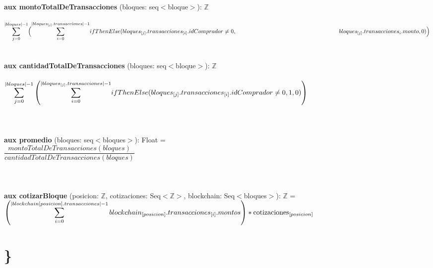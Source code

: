 \documentclass{article}
\newcommand{\Entero}{$\mathds{Z}$}
\begin{document}
        {\selectfont\textbf{aux montoTotalDeTransacciones} (bloques: seq$<$bloque$>$): \Entero}\\\\
    \indent\indent $\mathlarger\sum\limits_{j=0}^{|bloques|-1} \Bigl(\mathlarger\sum\limits_{i=0}^{|bloques_{[j]}.transacciones|-1}
        ifThenElse (bloques_{[j]}.transacciones_{[i]}.idComprador \ne 0,\\
        \indent\indent\indent\indent\indent\indent\indent\indent\indent\indent\indent\indent bloques_{[j]}.transacciones_{{i}}.monto, 0)\Bigr)$\\\\\\

        {\selectfont\textbf{aux cantidadTotalDeTransacciones} (bloques: seq$<$bloque$>$): \Entero}\\\\
    \indent\indent$\mathlarger\sum\limits_{j=0}^{|bloques|-1} \left(\mathlarger\sum\limits_{i=0}^{|bloques_{[j]}.transacciones|-1} ifThenElse(bloques_{[j]}.transacciones_{[i]}.idComprador \ne 0, 1, 0)\right)\indent\indent\indent$\\\\\\\\

    {\selectfont\textbf{aux promedio} (bloques: seq$<$bloques$>$): Float} = \\

    \indent\indent$\dfrac{montoTotalDeTransacciones(bloques)}{cantidadTotalDeTransacciones(bloques)}$\\\\\\\\

    {\selectfont\textbf{aux cotizarBloque} (posicion: \Entero, cotizaciones: Seq$<$\Entero$>$, blockchain: Seq$<$bloques$>$): \Entero} =\\

        \indent\indent $\left( \mathlarger{\sum\limits_{i=0}^{|blockchain[posicion].transacciones|-1} blockchain_{[posicion]}.transacciones_{[i]}.montos} \right) * \text{cotizaciones}_{[posicion]}$\\

\section*{\}}
\end{document}
